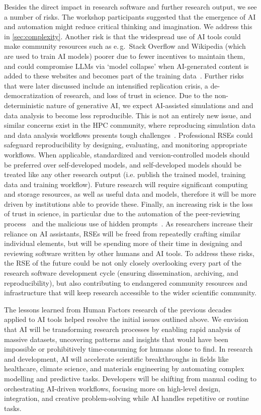 \documentclass{eceasst}
\newcommand{\eg}{e.\,g.}
\begin{document}
Besides the direct impact in research software and further research output,
we see a number of risks.
The workshop participants suggested that the emergence of AI and automation might reduce critical thinking and imagination.
We address this in \autoref{sec:complexity}.
Another risk is that the widespread use of AI tools could make community resources
such as \eg\ Stack Overflow and Wikipedia (which are used to train AI models) poorer
due to fewer incentives to maintain them, and could compromise LLMs via `model collapse'
when AI-generated content is added to these websites and becomes part of the training data~\cite{Shumailov2024}.
Further risks that were later discussed include an intensified replication crisis, a de-democratization of research, and loss of trust in science.
Due to the non-deterministic nature of generative AI, we expect AI-assisted simulations and and data analysis to become less reproducible.
This is not an entirely new issue, and similar concerns exist in the HPC community,
where reproducing simulation data and data analysis workflows presents tough challenges~\cite{Antunes2024}.
Professional RSEs could safeguard reproducibility by designing, evaluating, and monitoring appropriate workflows.
When applicable, standardized and version-controlled models should be preferred
over self-developed models, and self-developed models should be treated like any
other research output (i.e. publish the trained model, training data and training workflow).
Future research will require significant computing and storage resources, as well as useful data and models,
therefore it will be more driven by institutions able to provide these.
Finally, an increasing risk is the loss of trust in science,
in particular due to the automation of the peer-reviewing process~\cite{Naddaf2025}
and the malicious use of hidden prompts~\cite{Gibney2025}.
As researchers increase their reliance on AI assistants,
RSEs will be freed from repeatedly crafting similar individual elements,
but will be spending more of their time in designing and reviewing software written by other humans and AI tools.
To address these risks, the RSE of the future could be not only closely overlooking every part
of the research software development cycle (ensuring dissemination, archiving, and reproducibility),
but also contributing to endangered community resources and infrastructure that
will keep research accessible to the wider scientific community.

The lessons learned from Human Factors research of the previous decades~\cite{Simkute2025}
applied to AI tools helped resolve the initial issues outlined above.
We envision that AI will be transforming research processes by enabling rapid analysis of massive datasets,
uncovering patterns and insights that would have been impossible or prohibitively time-consuming for humans alone to find.
In research and development, AI will accelerate scientific breakthroughs in fields like healthcare,
climate science, and materials engineering by automating complex modelling and predictive tasks.
Developers will be shifting from manual coding to orchestrating AI-driven workflows,
focusing more on high-level design, integration, and creative problem-solving while AI handles repetitive or routine tasks.
\end{document}
